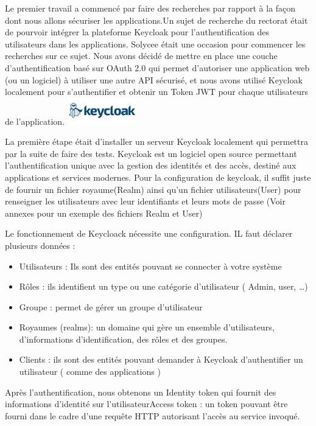 \documentclass[12pt]{article}
\begin{document}
Le premier travail a commencé par faire des recherches par rapport à la façon dont nous allons sécuriser les applications.Un sujet de recherche du rectorat était de pourvoir intégrer la plateforme Keycloak pour l'authentification des utilisateurs dans les applications. Solycee était une occasion pour commencer les recherches sur ce sujet.  Nous avons décidé de mettre en place une couche d'authentification basé sur OAuth 2.0 qui permet d'autoriser une application web (ou un logiciel) à utiliser une autre API sécurisé, et nous avons utilisé Keycloak localement pour s'authentifier et obtenir un Token JWT pour chaque utilisateurs de l'application.  \includegraphics[width=30mm,scale=0.5]{diagrammes/logo_Keycloak.jpeg}  

La première étape était  d'installer un serveur Keycloak localement qui permettra par la suite de faire des tests. Keycloak  est un logiciel open source permettant l'authentification unique avec la gestion des identités et des accès, destiné aux applications et services modernes. Pour la configuration de keycloak, il suffit juste de fournir un fichier  royaume(Realm) ainsi qu'un fichier utilisateurs(User) pour renseigner les utilisateurs  avec leur identifiants et leurs mots de passe (Voir annexes pour un exemple des fichiers Realm et User)

Le fonctionnement de Keycloack nécessite  une configuration. IL faut déclarer plusieurs données : 
\begin{itemize}
\item Utilisateurs : Ils sont des entités pouvant se connecter à votre système
\item Rôles : ils identifient un type ou une catégorie d’utilisateur ( Admin, user, …)
\item Groupe : permet de gérer un groupe d’utilisateur
\item Royaumes (realms): un domaine qui gère un ensemble d’utilisateurs, d’informations d’identification, des rôles et des groupes.
\item Clients : ils sont des entités pouvant demander à Keycloak d’authentifier un utilisateur ( comme des applications )
\end{itemize}

Après l’authentification, nous obtenons un Identity token qui fournit des informations d’identité sur l’utilisateurAccess token : un token pouvant être fourni dans le cadre d’une requête HTTP autorisant l’accès au service invoqué.
\end{document}
